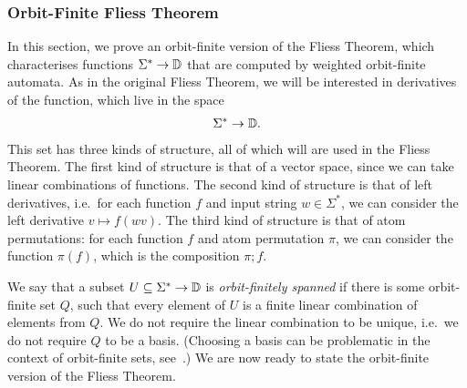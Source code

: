 \subsubsection{Orbit-Finite Fliess Theorem}
In this section, we prove an orbit-finite version of the Fliess Theorem, which characterises functions $\Sigma^* \to \mathbb D$ that are computed by weighted orbit-finite automata. As in the original Fliess Theorem, we will be interested in derivatives of the function, which live in the space  
\begin{align*}
\Sigma^* \to \mathbb D.
\end{align*}
This set has three kinds of structure, all of which will are used in the Fliess Theorem. The first kind of structure is that of a vector space, since we can take linear combinations of functions. The second kind of structure is that of left derivatives, i.e.~for each function $f$ and input string $w \in \Sigma^*$, we can consider the left derivative $v \mapsto f(wv)$. The third kind of structure is that of atom permutations: for each function $f$ and atom permutation $\pi$, we can consider the function $\pi(f)$, which is the composition $\pi;f$.

We say that a subset  $U \subseteq \Sigma^* \to \mathbb D$  is \emph{orbit-finitely spanned} if there is some orbit-finite set $Q$, such that  every element of $U$ is a finite linear combination of elements from $Q$. We do not require the linear combination to be unique, i.e.~we do not require $Q$ to be a basis. (Choosing a basis can be problematic in the context of orbit-finite sets, see~\cite[Example 77]{bojanczyk_slightly}.) We are now ready to state the orbit-finite version of the Fliess Theorem.

